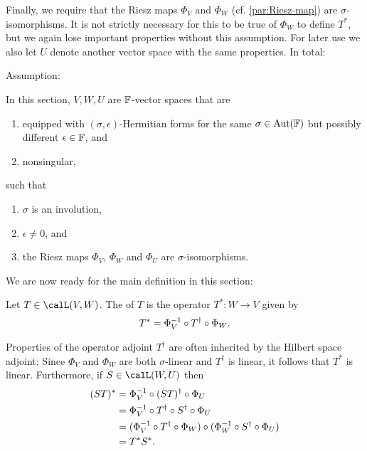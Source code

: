 Finally, we require that the Riesz maps $\Phi_V$ and $\Phi_W$ (cf. \cref{par:Riesz-map}) are $\sigma$-isomorphisms. It is not strictly necessary for this to be true of $\Phi_W$ to define $T^*$, but we again lose important properties without this assumption. For later use we also let $U$ denote another vector space with the same properties. In total:

Assumption:

In this section, $V,W,U$ are $\mathbb{F}$-vector spaces that are
%
\begin{enumerate}
    \item equipped with $(\sigma,\epsilon)$-Hermitian forms for the same $\sigma \in \mathrm{Aut}(\mathbb{F})$ but possibly different $\epsilon \in \mathbb{F}$, and
    \item nonsingular,
\end{enumerate}
%
such that
%
\begin{enumerate}[resume]
    \item $\sigma$ is an involution,
    \item $\epsilon \neq 0$, and
    \item the Riesz maps $\Phi_V$, $\Phi_W$ and $\Phi_U$ are $\sigma$-isomorphisms.
\end{enumerate}


We are now ready for the main definition in this section:

\begin{definition}
    Let $T \in \lin(V,W)$. The  of $T$ is the operator $T^* \colon W \to V$ given by
    \begin{equation*}
        T^*
            = \Phi_V^{-1} \circ T^\dagger \circ \Phi_W.
    \end{equation*}
\end{definition}
%
Properties of the operator adjoint $T^\dagger$ are often inherited by the Hilbert space adjoint: Since $\Phi_V$ and $\Phi_W$ are both $\sigma$-linear and $T^\dagger$ is linear, it follows that $T^*$ is linear. Furthermore, if $S \in \lin(W,U)$ then
%
\begin{align*}
    (ST)^*
        &= \Phi_V^{-1} \circ (ST)^\dagger \circ \Phi_U \\
        &= \Phi_V^{-1} \circ T^\dagger \circ S^\dagger \circ \Phi_U \\
        &= (\Phi_V^{-1} \circ T^\dagger \circ \Phi_W) \circ (\Phi_W^{-1} \circ S^\dagger \circ \Phi_U) \\
        &= T^* S^*.
\end{align*}

